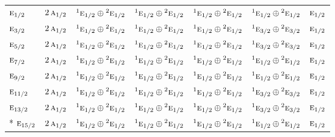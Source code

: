 \documentclass[10pt,a4paper]{article}
\numberwithin{equation}{section}
\newcommand{\irr}[1]{\text{\normalfont\scshape #1}}
\newcommand{\conjpair}[1]{{}^{#1}}
\begin{document}
{\begin{longtable}{@{}lcccccc@{}}
$\irr{e}_{1/2}$ & $2\,\irr{a}_{1/2}$ & $\conjpair{1}\irr{e}_{1/2}\oplus \conjpair{2}\irr{e}_{1/2}$ & $\conjpair{1}\irr{e}_{1/2}\oplus \conjpair{2}\irr{e}_{1/2}$ & $\conjpair{1}\irr{e}_{1/2}\oplus \conjpair{2}\irr{e}_{1/2}$ & $\conjpair{1}\irr{e}_{1/2}\oplus \conjpair{2}\irr{e}_{1/2}$ & $\irr{e}_{1/2}$\\
$\irr{e}_{3/2}$ & $2\,\irr{a}_{1/2}$ & $\conjpair{1}\irr{e}_{1/2}\oplus \conjpair{2}\irr{e}_{1/2}$ & $\conjpair{1}\irr{e}_{1/2}\oplus \conjpair{2}\irr{e}_{1/2}$ & $\conjpair{1}\irr{e}_{1/2}\oplus \conjpair{2}\irr{e}_{1/2}$ & $\conjpair{1}\irr{e}_{3/2}\oplus \conjpair{2}\irr{e}_{3/2}$ & $\irr{e}_{1/2}$\\
$\irr{e}_{5/2}$ & $2\,\irr{a}_{1/2}$ & $\conjpair{1}\irr{e}_{1/2}\oplus \conjpair{2}\irr{e}_{1/2}$ & $\conjpair{1}\irr{e}_{1/2}\oplus \conjpair{2}\irr{e}_{1/2}$ & $\conjpair{1}\irr{e}_{1/2}\oplus \conjpair{2}\irr{e}_{1/2}$ & $\conjpair{1}\irr{e}_{3/2}\oplus \conjpair{2}\irr{e}_{3/2}$ & $\irr{e}_{1/2}$\\
$\irr{e}_{7/2}$ & $2\,\irr{a}_{1/2}$ & $\conjpair{1}\irr{e}_{1/2}\oplus \conjpair{2}\irr{e}_{1/2}$ & $\conjpair{1}\irr{e}_{1/2}\oplus \conjpair{2}\irr{e}_{1/2}$ & $\conjpair{1}\irr{e}_{1/2}\oplus \conjpair{2}\irr{e}_{1/2}$ & $\conjpair{1}\irr{e}_{1/2}\oplus \conjpair{2}\irr{e}_{1/2}$ & $\irr{e}_{1/2}$\\
$\irr{e}_{9/2}$ & $2\,\irr{a}_{1/2}$ & $\conjpair{1}\irr{e}_{1/2}\oplus \conjpair{2}\irr{e}_{1/2}$ & $\conjpair{1}\irr{e}_{1/2}\oplus \conjpair{2}\irr{e}_{1/2}$ & $\conjpair{1}\irr{e}_{1/2}\oplus \conjpair{2}\irr{e}_{1/2}$ & $\conjpair{1}\irr{e}_{1/2}\oplus \conjpair{2}\irr{e}_{1/2}$ & $\irr{e}_{1/2}$\\
$\irr{e}_{11/2}$ & $2\,\irr{a}_{1/2}$ & $\conjpair{1}\irr{e}_{1/2}\oplus \conjpair{2}\irr{e}_{1/2}$ & $\conjpair{1}\irr{e}_{1/2}\oplus \conjpair{2}\irr{e}_{1/2}$ & $\conjpair{1}\irr{e}_{1/2}\oplus \conjpair{2}\irr{e}_{1/2}$ & $\conjpair{1}\irr{e}_{3/2}\oplus \conjpair{2}\irr{e}_{3/2}$ & $\irr{e}_{1/2}$\\
$\irr{e}_{13/2}$ & $2\,\irr{a}_{1/2}$ & $\conjpair{1}\irr{e}_{1/2}\oplus \conjpair{2}\irr{e}_{1/2}$ & $\conjpair{1}\irr{e}_{1/2}\oplus \conjpair{2}\irr{e}_{1/2}$ & $\conjpair{1}\irr{e}_{1/2}\oplus \conjpair{2}\irr{e}_{1/2}$ & $\conjpair{1}\irr{e}_{3/2}\oplus \conjpair{2}\irr{e}_{3/2}$ & $\irr{e}_{1/2}$\\*
$\irr{e}_{15/2}$ & $2\,\irr{a}_{1/2}$ & $\conjpair{1}\irr{e}_{1/2}\oplus \conjpair{2}\irr{e}_{1/2}$ & $\conjpair{1}\irr{e}_{1/2}\oplus \conjpair{2}\irr{e}_{1/2}$ & $\conjpair{1}\irr{e}_{1/2}\oplus \conjpair{2}\irr{e}_{1/2}$ & $\conjpair{1}\irr{e}_{1/2}\oplus \conjpair{2}\irr{e}_{1/2}$ & $\irr{e}_{1/2}$\\
\bottomrule\end{longtable}}
\end{document}
